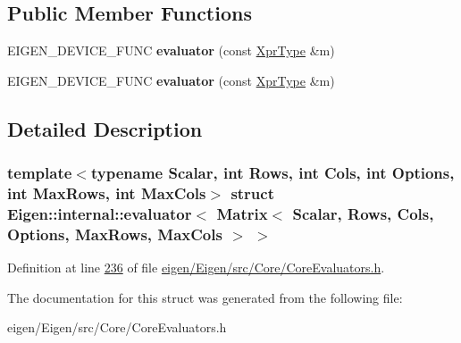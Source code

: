\subsection*{Public Member Functions}
\begin{DoxyCompactItemize}
\item 
\mbox{\label{struct_eigen_1_1internal_1_1evaluator_3_01_matrix_3_01_scalar_00_01_rows_00_01_cols_00_01_optionc8e41d58a4f0b7a4fe2e5592b375183d_afcc27bd4179b8c2836a1793fe40ac9ef}} 
E\+I\+G\+E\+N\+\_\+\+D\+E\+V\+I\+C\+E\+\_\+\+F\+U\+NC {\bfseries evaluator} (const \hyperlink{group___core___module_class_eigen_1_1_matrix}{Xpr\+Type} \&m)
\item 
\mbox{\label{struct_eigen_1_1internal_1_1evaluator_3_01_matrix_3_01_scalar_00_01_rows_00_01_cols_00_01_optionc8e41d58a4f0b7a4fe2e5592b375183d_afcc27bd4179b8c2836a1793fe40ac9ef}} 
E\+I\+G\+E\+N\+\_\+\+D\+E\+V\+I\+C\+E\+\_\+\+F\+U\+NC {\bfseries evaluator} (const \hyperlink{group___core___module_class_eigen_1_1_matrix}{Xpr\+Type} \&m)
\end{DoxyCompactItemize}


\subsection{Detailed Description}
\subsubsection*{template$<$typename Scalar, int Rows, int Cols, int Options, int Max\+Rows, int Max\+Cols$>$\newline
struct Eigen\+::internal\+::evaluator$<$ Matrix$<$ Scalar, Rows, Cols, Options, Max\+Rows, Max\+Cols $>$ $>$}



Definition at line \hyperlink{eigen_2_eigen_2src_2_core_2_core_evaluators_8h_source_l00236}{236} of file \hyperlink{eigen_2_eigen_2src_2_core_2_core_evaluators_8h_source}{eigen/\+Eigen/src/\+Core/\+Core\+Evaluators.\+h}.



The documentation for this struct was generated from the following file\+:\begin{DoxyCompactItemize}
\item 
eigen/\+Eigen/src/\+Core/\+Core\+Evaluators.\+h\end{DoxyCompactItemize}
